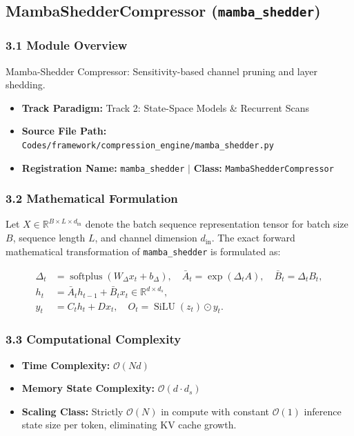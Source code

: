 \subsection{MambaShedderCompressor (\texttt{mamba\_shedder})}
\label{sec:app_module_mamba\_shedder}

\subsubsection*{3.1 Module Overview}
Mamba-Shedder Compressor: Sensitivity-based channel pruning and layer shedding.
\begin{itemize}
    \item \textbf{Track Paradigm:} Track 2: State-Space Models & Recurrent Scans
    \item \textbf{Source File Path:} \texttt{Codes/framework/compression\_engine/mamba\_shedder.py}
    \item \textbf{Registration Name:} \texttt{mamba\_shedder} $\mid$ \textbf{Class:} \texttt{MambaShedderCompressor}
\end{itemize}

\subsubsection*{3.2 Mathematical Formulation}
Let $X \in \mathbb{R}^{B \times L \times d_{\text{in}}}$ denote the batch sequence representation tensor for batch size $B$, sequence length $L$, and channel dimension $d_{\text{in}}$. The exact forward mathematical transformation of \texttt{mamba\_shedder} is formulated as:

\begin{align}
\Delta_t &= \operatorname{softplus}(W_\Delta x_t + b_\Delta), \quad \bar{A}_t = \exp(\Delta_t A), \quad \bar{B}_t = \Delta_t B_t, \\
h_t &= \bar{A}_t h_{t-1} + \bar{B}_t x_t \in \mathbb{R}^{d \times d_s}, \\
y_t &= C_t h_t + D x_t, \quad O_t = \operatorname{SiLU}(z_t) \odot y_t.
\end{align}


\subsubsection*{3.3 Computational Complexity}
\begin{itemize}
    \item \textbf{Time Complexity:} $\mathcal{O}(N d)$
    \item \textbf{Memory State Complexity:} $\mathcal{O}(d \cdot d_s)$
    \item \textbf{Scaling Class:} Strictly $\mathcal{O}(N)$ in compute with constant $\mathcal{O}(1)$ inference state size per token, eliminating KV cache growth.
\end{itemize}

